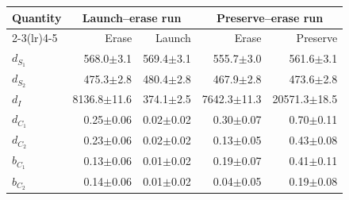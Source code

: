 \begingroup
\setlength{\tabcolsep}{3pt}
\begin{tabular}{@{}lrrrr@{}}
\toprule
Quantity & \multicolumn{2}{c}{Launch--erase run} & \multicolumn{2}{c}{Preserve--erase run} \\
\cmidrule(lr){2-3}\cmidrule(lr){4-5}
 & Erase & Launch & Erase & Preserve \\
\midrule
$d_{S_1}$ & 568.0\ensuremath{\pm}3.1 & 569.4\ensuremath{\pm}3.1 & 555.7\ensuremath{\pm}3.0 & 561.6\ensuremath{\pm}3.1 \\
$d_{S_2}$ & 475.3\ensuremath{\pm}2.8 & 480.4\ensuremath{\pm}2.8 & 467.9\ensuremath{\pm}2.8 & 473.6\ensuremath{\pm}2.8 \\
$d_I$ & 8136.8\ensuremath{\pm}11.6 & 374.1\ensuremath{\pm}2.5 & 7642.3\ensuremath{\pm}11.3 & 20571.3\ensuremath{\pm}18.5 \\
$d_{C_1}$ & 0.25\ensuremath{\pm}0.06 & 0.02\ensuremath{\pm}0.02 & 0.30\ensuremath{\pm}0.07 & 0.70\ensuremath{\pm}0.11 \\
$d_{C_2}$ & 0.23\ensuremath{\pm}0.06 & 0.02\ensuremath{\pm}0.02 & 0.13\ensuremath{\pm}0.05 & 0.43\ensuremath{\pm}0.08 \\
$b_{C_1}$ & 0.13\ensuremath{\pm}0.06 & 0.01\ensuremath{\pm}0.02 & 0.19\ensuremath{\pm}0.07 & 0.41\ensuremath{\pm}0.11 \\
$b_{C_2}$ & 0.14\ensuremath{\pm}0.06 & 0.01\ensuremath{\pm}0.02 & 0.04\ensuremath{\pm}0.05 & 0.19\ensuremath{\pm}0.08 \\
\bottomrule
\end{tabular}
\endgroup
